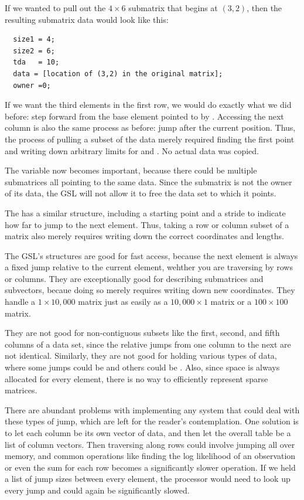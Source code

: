If we wanted to pull out the $4 \times 6$ submatrix that begins at $(3, 2)$, then
the resulting submatrix data would look like this:
\begin{lstlisting}
  size1 = 4;
  size2 = 6;
  tda   = 10;
  data = [location of (3,2) in the original matrix];
  owner =0;
\end{lstlisting}
If we want the third elements in the first row, we would do exactly
what we did before: step  forward from the base
element pointed to by . Accessing the next column is also the
same process as before: jump  after the current
position. Thus, the process of pulling a subset of the data merely
required finding the first point and writing down arbitrary limits for
 and . No actual data was copied. 




The 
variable now becomes important, because there could be multiple
submatrices all pointing to the same data. Since the submatrix is not
the owner of its data, the GSL will not allow it to free the data set
to which it points.

The  has a similar structure, including a starting point
and a stride to indicate how far to jump to the next element. Thus,
taking a row or column subset of a matrix also merely requires writing
down the correct coordinates and lengths.

The GSL's structures are good for fast access, because the next element
is always a fixed jump relative to the current element, wehther you are
traversing by rows or columns. They are exceptionally good for
describing submatrices and subvectors, becaue doing so merely requires
writing down new coordinates. They handle a $1 \times 10,000$ matrix
just as easily as a $10,000 \times 1$ matrix or a $100 \times 100$ matrix.

They are not good for non-contiguous subsets like the first, second,
and fifth columns of a data set, since the relative jumps from one column
to the next are not identical. Similarly, they are not good for holding
various types of data, where some jumps could be 
and others could be . Also, since space is always allocated
for every element, there is no way to efficiently represent sparse matrices.

There are abundant problems with implementing any system that could
deal with these types of jump, which are left for the reader's
contemplation. One solution is to let each column be its own vector of
data, and then let the overall table be a list of column vectors. Then
traversing along rows could involve jumping all over memory, and common
operations like finding the log likelihood of an observation or even
the sum for each row becomes a significantly slower operation. If we
held a list of jump sizes between every element, the processor would
need to look up every jump and could again be significantly slowed.

